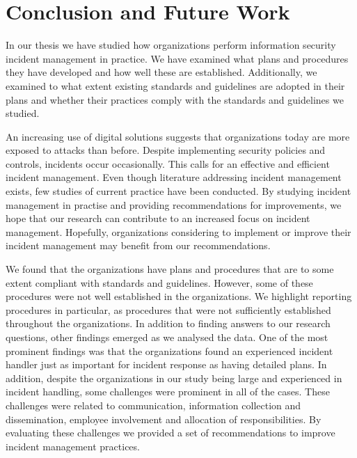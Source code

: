 \chapter{Conclusion and Future Work}

In our thesis we have studied how organizations perform information security incident management in practice. We have examined what plans and procedures they have developed and how well these are established. Additionally, we examined to what extent existing standards and guidelines are adopted in their plans and whether their practices comply with the standards and guidelines we studied.

An increasing use of digital solutions suggests that organizations today are more exposed to attacks than before. Despite implementing security policies and controls, incidents occur occasionally. This calls for an effective and efficient incident management. Even though literature addressing incident management exists, few studies of current practice have been conducted. By studying incident management in practise and providing recommendations for improvements, we hope that our research can contribute to an increased focus on incident management. Hopefully, organizations considering to implement or improve their incident management may benefit from our recommendations.

We found that the organizations have plans and procedures that are to some extent compliant with standards and guidelines. However, some of these procedures were not well established in the organizations. We highlight reporting procedures in particular, as procedures that were not sufficiently established throughout the organizations. In addition to finding answers to our research questions, other findings emerged as we analysed the data. One of the most prominent findings was that the organizations found an experienced incident handler just as important for incident response as having detailed plans. In addition, despite the organizations in our study being large and experienced in incident handling, some challenges were prominent in all of the cases. These challenges were related to communication, information collection and dissemination, employee involvement and allocation of responsibilities. By evaluating these challenges we provided a set of recommendations to improve incident management practices.

